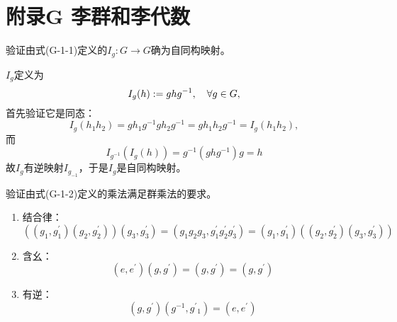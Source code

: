 
\chapter*{附录G \quad 李群和李代数}
\setcounter{xiti}{0}
\begin{xiti}
	\item 验证由式(G-1-1)定义的$I_g \colon G\rightarrow G$确为自同构映射。
	
	\begin{zm}
		$I_g $定义为
		\[I_g(h) := g h g^{-1}\qc \forall g\in G, \]
		首先验证它是同态：
		\begin{displaymath}
		I_g (h_1 h_2) = g h_1 g^{-1} g h_2 g^{-1}= g h_1 h_2 g^{-1} = I_g (h_1 h_2),
		\end{displaymath}
		而
		\begin{displaymath}
		I_{g^{-1}} (I_g (h) )= g^{-1} \left( g h g^{-1} \right) g=h
		\end{displaymath}
		故$I_g $有逆映射$I_{g_{-1}} $，于是$I_g $是自同构映射。
	\end{zm}
	
	\item 验证由式(G-1-2)定义的乘法满足群乘法的要求。
	
	\begin{zm}
		\begin{enumerate}
			\item 结合律：
			\begin{displaymath}
			\left( \left(g_1,g^\prime_1\right) \left(g_2,g^\prime_2\right) \right) \left(g_3,g^\prime_3\right) = \left( g_1 g_2 g_3 , g^\prime_1 g^\prime_2 g^\prime_3 \right)= \left( g_1,g^\prime_1 \right) \left( \left( g_2,g^\prime_2 \right) \left( g_3,g^\prime_3 \right) \right) 
			\end{displaymath}
			\item 含幺：
			\begin{displaymath}
			\left( e,e^\prime \right) \left( g,g^\prime \right) = \left( g,g^\prime \right) = \left( g,g^\prime \right)
			\end{displaymath}
			\item 有逆：
			\begin{displaymath}
			\left( g,g^\prime \right) \left( g^{-1}, {g^\prime}{_1} \right)= \left( e,e^\prime \right)
			\end{displaymath}
		\end{enumerate}
	\end{zm}


\end{xiti}
